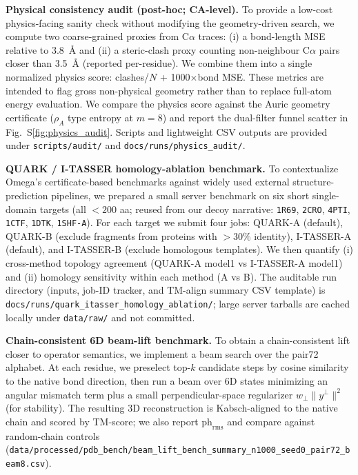 \textbf{Physical consistency audit (post-hoc; CA-level).} To provide a low-cost physics-facing sanity check without modifying the geometry-driven search, we compute two coarse-grained proxies from C$\alpha$ traces: (i) a bond-length MSE relative to 3.8~\AA{} and (ii) a steric-clash proxy counting non-neighbour C$\alpha$ pairs closer than 3.5~\AA{} (reported per-residue). We combine them into a single normalized physics score: clashes/$N$ + 1000$\times$bond MSE. These metrics are intended to flag gross non-physical geometry rather than to replace full-atom energy evaluation. We compare the physics score against the Auric geometry certificate ($\rho_A$ type entropy at $m=8$) and report the dual-filter funnel scatter in Fig.~S\ref{fig:physics_audit}. Scripts and lightweight CSV outputs are provided under \texttt{scripts/audit/} and \texttt{docs/runs/physics\_audit/}.

\textbf{QUARK / I-TASSER homology-ablation benchmark.} To contextualize Omega's certificate-based benchmarks against widely used external structure-prediction pipelines, we prepared a small server benchmark on six short single-domain targets (all $<200$ aa; reused from our decoy narrative: \texttt{1R69}, \texttt{2CRO}, \texttt{4PTI}, \texttt{1CTF}, \texttt{1DTK}, \texttt{1SHF-A}). For each target we submit four jobs: QUARK-A (default), QUARK-B (exclude fragments from proteins with $>$30\% identity), I-TASSER-A (default), and I-TASSER-B (exclude homologous templates). We then quantify (i) cross-method topology agreement (QUARK-A model1 vs I-TASSER-A model1) and (ii) homology sensitivity within each method (A vs B). The auditable run directory (inputs, job-ID tracker, and TM-align summary CSV template) is \texttt{docs/runs/quark\_itasser\_homology\_ablation/}; large server tarballs are cached locally under \texttt{data/raw/} and not committed.

\textbf{Chain-consistent 6D beam-lift benchmark.} To obtain a chain-consistent lift closer to operator semantics, we implement a beam search over the pair72 alphabet. At each residue, we preselect top-$k$ candidate steps by cosine similarity to the native bond direction, then run a beam over 6D states minimizing an angular mismatch term plus a small perpendicular-space regularizer $w_{\perp}\|y^{\perp}\|^2$ (for stability). The resulting 3D reconstruction is Kabsch-aligned to the native chain and scored by TM-score; we also report $\mathrm{ph}_{\mathrm{rms}}$ and compare against random-chain controls (\texttt{data/processed/pdb\_bench/beam\_lift\_bench\_summary\_n1000\_seed0\_pair72\_beam8.csv}).

